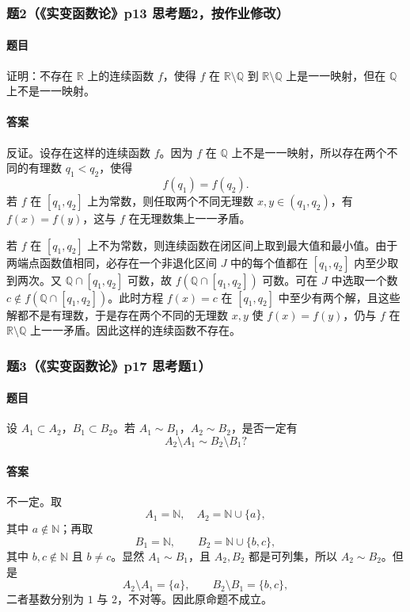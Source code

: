 \documentclass{article}
\newcommand{\R}{\mathbb{R}}
\newcommand{\Q}{\mathbb{Q}}
\newcommand{\N}{\mathbb{N}}
\begin{document}
\subsubsection*{题2（《实变函数论》p13 思考题2，按作业修改）}
\paragraph{题目}证明：不存在 $\R$ 上的连续函数 $f$，使得 $f$ 在 $\R\setminus\Q$ 到 $\R\setminus\Q$ 上是一一映射，但在 $\Q$ 上不是一一映射。

\paragraph{答案}反证。设存在这样的连续函数 $f$。因为 $f$ 在 $\Q$ 上不是一一映射，所以存在两个不同的有理数 $q_1<q_2$，使得
\[
f(q_1)=f(q_2).
\]
若 $f$ 在 $[q_1,q_2]$ 上为常数，则任取两个不同无理数 $x,y\in(q_1,q_2)$，有 $f(x)=f(y)$，这与 $f$ 在无理数集上一一矛盾。

若 $f$ 在 $[q_1,q_2]$ 上不为常数，则连续函数在闭区间上取到最大值和最小值。由于两端点函数值相同，必存在一个非退化区间 $J$ 中的每个值都在 $[q_1,q_2]$ 内至少取到两次。又 $\Q\cap[q_1,q_2]$ 可数，故 $f(\Q\cap[q_1,q_2])$ 可数。可在 $J$ 中选取一个数 $c\notin f(\Q\cap[q_1,q_2])$。此时方程 $f(x)=c$ 在 $[q_1,q_2]$ 中至少有两个解，且这些解都不是有理数，于是存在两个不同的无理数 $x,y$ 使 $f(x)=f(y)$，仍与 $f$ 在 $\R\setminus\Q$ 上一一矛盾。因此这样的连续函数不存在。

\subsubsection*{题3（《实变函数论》p17 思考题1）}
\paragraph{题目}设 $A_1\subset A_2$，$B_1\subset B_2$。若 $A_1\sim B_1$，$A_2\sim B_2$，是否一定有
\[
A_2\setminus A_1\sim B_2\setminus B_1?
\]

\paragraph{答案}不一定。取
\[
A_1=\N,\quad A_2=\N\cup\{a\},
\]
其中 $a\notin\N$；再取
\[
B_1=\N,
\qquad B_2=\N\cup\{b,c\},
\]
其中 $b,c\notin\N$ 且 $b\ne c$。显然 $A_1\sim B_1$，且 $A_2,B_2$ 都是可列集，所以 $A_2\sim B_2$。但是
\[
A_2\setminus A_1=\{a\},\qquad B_2\setminus B_1=\{b,c\},
\]
二者基数分别为 $1$ 与 $2$，不对等。因此原命题不成立。
\end{document}

